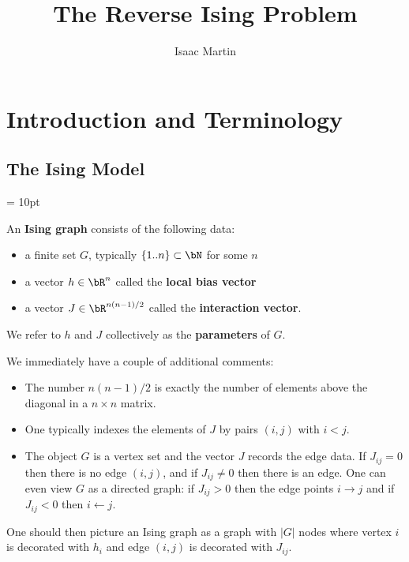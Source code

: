 \documentclass[raggedright, nofonts, notitlepage, openany, debug]{tufte-book}
\begin{document}
\newpage
\title{The Reverse Ising Problem}
\author{Isaac Martin}
\maketitle
\chapter{Introduction and Terminology}
\section{The Ising Model}
\hfuzz = 10pt



\begin{defn}
  An \textbf{Ising graph} consists of the following data:
  \begin{itemize}
    \item a finite set $G$, typically $\{1..n\}\subset \bN$ for some $n$
    \item a vector $h \in \bR^n$ called the  \textbf{local bias vector}
    \item a vector $J \in \bR^{n(n-1)/2}$ called the \textbf{interaction vector}.
  \end{itemize}
  We refer to $h$ and $J$ collectively as the \textbf{parameters} of $G$.
\end{defn}

We immediately have a couple of additional comments:
\begin{itemize}
  \item The number $n(n-1)/2$ is exactly the number of elements above the diagonal in a $n\times n$ matrix.
  \item One typically indexes the elements of $J$ by pairs $(i,j)$ with $i < j$.
  \item The object $G$ is a vertex set and the vector $J$ records the edge data. If $J_{ij} = 0$ then there is no edge $(i,j)$, and if $J_{ij} \neq 0$ then there is an edge. One can even view $G$ as a directed graph: if $J_{ij} > 0$ then the edge points $i\rightarrow j$ and if $J_{ij} < 0$ then $i \leftarrow j$.
\end{itemize}
One should then picture an Ising graph as a graph with $|G|$ nodes where vertex $i$ is decorated with $h_i$ and edge $(i,j)$ is decorated with $J_{ij}$.
\end{document}
